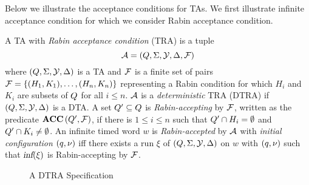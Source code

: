 Below we illustrate the acceptance conditions for TAs.
We first illustrate infinite acceptance condition for which
we consider Rabin acceptance condition.


\begin{definition}
A TA with \emph{Rabin acceptance condition} (TRA) is a tuple
\begin{equation}\label{eq:tra}
    \mathcal{A}=(Q,\Sigma,\mathcal{Y},\Delta,\mathcal{F})
\end{equation}
where $(Q,\Sigma,\mathcal{Y},\Delta)$ is a TA and $\mathcal{F}$ is a finite
set of pairs
$
    \mathcal{F}
        = \{
            (H_1,K_1 ),
            \dots,
            (H_n,K_n)
        \}
$ representing a Rabin condition for which
$H_i$ and $K_i$ are subsets of $Q$ for all $i\le n$.
$\mathcal{A}$ is a \emph{deterministic} TRA (DTRA) if $(Q,\Sigma,\mathcal{Y},\Delta)$ is a DTA.
A set $Q' \subseteq Q $ is \emph{Rabin-accepting} by $\mathcal{F}$,
written as the predicate $\mbox{\bf ACC} \left( {Q'}, {\mathcal{F}} \right)$,
if there is $ 1 \leq i \leq n$ such that $ Q' \cap H_i= \emptyset $
and $ Q' \cap K_i \neq \emptyset $. An infinite timed word $w$ is \emph{Rabin-accepted} by
$\mathcal{A}$ with \emph{initial configuration} $(q,\nu)$ iff there exists a run $\xi$ of $(Q,\Sigma,\mathcal{Y},\Delta)$ on $w$ with $(q,\nu)$ such that
$
    \mbox{\sl inf} ( 
         \xi
     )
$ is Rabin-accepting by $\mathcal{F}$.
\end{definition}

\begin{figure}
    \centering
    \resizebox{.5\textwidth}{!}{
        
        }
    \caption{A DTRA Specification}
    \label{fig:dta}
\end{figure}


